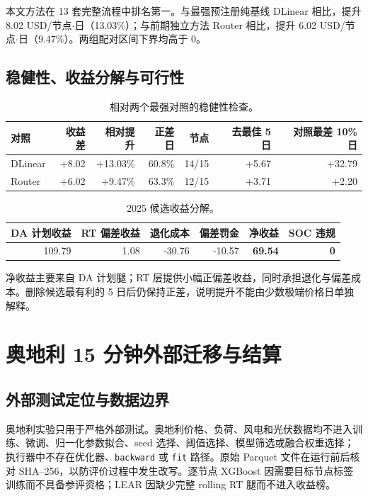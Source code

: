 \documentclass[UTF8,a4paper,11pt,fontset=fandol]{ctexart}
\newcommand{\usdnode}{USD/节点$\cdot$日}
\newcommand{\best}[1]{\textbf{#1}}
\begin{document}
本文方法在 13 套完整流程中排名第一。与最强预注册纯基线 DLinear 相比，提升 8.02 \usdnode（13.03\%）；与前期独立方法 Router 相比，提升 6.02 \usdnode（9.47\%）。两组配对区间下界均高于 0。

\subsection{稳健性、收益分解与可行性}

\begin{table}[H]
\centering
\caption{相对两个最强对照的稳健性检查。}
\label{tab:robustness}
\footnotesize
\begin{tabular}{lrrrrrr}
\toprule
对照 & 收益差 & 相对提升 & 正差日 & 节点 & 去最佳 5 日 & 对照最差 10\% 日 \\
\midrule
DLinear & +8.02 & +13.03\% & 60.8\% & 14/15 & +5.67 & +32.79 \\
Router & +6.02 & +9.47\% & 63.3\% & 12/15 & +3.71 & +2.20 \\
\bottomrule
\end{tabular}
\end{table}

\begin{table}[H]
\centering
\caption{2025 候选收益分解。}
\label{tab:decomposition}
\small
\begin{tabular}{rrrrrr}
\toprule
DA 计划收益 & RT 偏差收益 & 退化成本 & 偏差罚金 & 净收益 & SOC 违规 \\
\midrule
109.79 & 1.08 & -30.76 & -10.57 & \best{69.54} & \best{0} \\
\bottomrule
\end{tabular}
\end{table}

净收益主要来自 DA 计划腿；RT 层提供小幅正偏差收益，同时承担退化与偏差成本。删除候选最有利的 5 日后仍保持正差，说明提升不能由少数极端价格日单独解释。

\section{奥地利 15 分钟外部迁移与结算}
\label{sec:austria}

\subsection{外部测试定位与数据边界}

奥地利实验只用于严格外部测试。奥地利价格、负荷、风电和光伏数据均不进入训练、微调、归一化参数拟合、seed 选择、阈值选择、模型筛选或融合权重选择；执行器中不存在优化器、\texttt{backward} 或 \texttt{fit} 路径。原始 Parquet 文件在运行前后核对 SHA--256，以防评价过程中发生改写。逐节点 XGBoost 因需要目标节点标签训练而不具备参评资格；LEAR 因缺少完整 rolling RT 腿而不进入收益榜。
\end{document}
